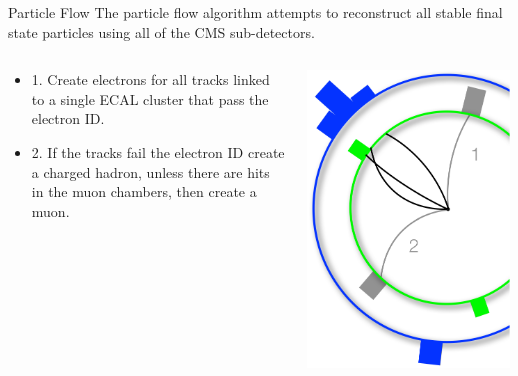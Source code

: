 \begin{frame}{Particle Flow}
The particle flow algorithm attempts to reconstruct all stable final state particles using all of the CMS sub-detectors.

\begin{columns}[T]
  \begin{column}{0.6\textwidth}
\footnotesize
    \begin{itemize}
    \item
      1. Create electrons for all tracks linked to a single ECAL cluster that pass the electron ID.
    \item
      2. If the tracks fail the electron ID create a charged hadron, unless there are hits in the muon chambers, then create a muon.
    \end{itemize}
  \end{column}
  \begin{column}{0.40\textwidth}
    \includegraphics[width=0.99\textwidth]{images/pf2.pdf}
  \end{column}
\end{columns}
\end{frame}


